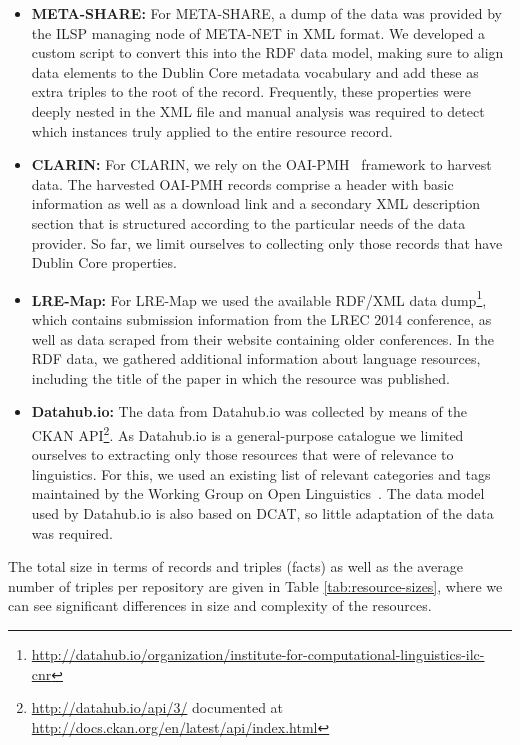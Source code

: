\documentclass[11pt]{article}
\begin{document}
\begin{itemize}
\item \textbf{META-SHARE:} For META-SHARE, a dump of the data was
provided by the ILSP managing node of META-NET in XML format. We developed a custom script to convert this
into the RDF data model, making sure to align data elements to the
Dublin Core metadata vocabulary and add these as extra triples to the root
of the record. Frequently, these properties were deeply nested in the XML file
and manual analysis was required to detect which instances truly applied to the
entire resource record.

\item \textbf{CLARIN:} For CLARIN, we rely on the OAI-PMH~\cite{sompel2004resource} framework to harvest data.
The harvested OAI-PMH records comprise a header with basic information as well as a download link and a secondary XML description
section that is structured according to the particular needs of the data provider.
So far, we limit ourselves to collecting only those records that
have Dublin Core properties.
\item \textbf{LRE-Map:} For LRE-Map we used the available RDF/XML data
    dump\footnote{\url{http://datahub.io/organization/institute-for-computational-linguistics-ilc-cnr}},
    which contains submission information from the LREC 2014 conference, as well as data
    scraped from their website containing older conferences.
    In the RDF data, we gathered additional
    information about language resources, including the title of the paper in which the 
    resource was published.
\item \textbf{Datahub.io:} The data from Datahub.io was collected by means of
    the CKAN API\footnote{\url{http://datahub.io/api/3/} documented at
    \url{http://docs.ckan.org/en/latest/api/index.html}}. As Datahub.io
is a general-purpose catalogue we limited ourselves to extracting only those
resources that were of relevance to linguistics. For this, we used an existing
list of relevant categories and tags maintained by the Working Group on Open
Linguistics~\cite{chiarcos2012open}. The data model used by Datahub.io is 
also based on DCAT, so little adaptation of the data was required.
\end{itemize}

The total size in terms of records and triples (facts) as well as the average
number of triples per repository are given in Table \ref{tab:resource-sizes}, where
we can see significant differences in size and complexity of the resources.
\end{document}
